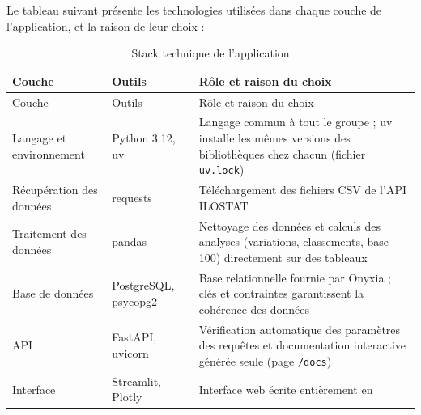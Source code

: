 \documentclass[
  french,
  12pt,
  letterpaper,
  DIV=11,
  numbers=noendperiod]{scrartcl}
\begin{document}
Le tableau suivant présente les technologies utilisées dans chaque
couche de l'application, et la raison de leur choix :

\begin{longtable}[]{@{}
  >{\raggedright\arraybackslash}p{}
  >{\raggedright\arraybackslash}p{}
  >{\raggedright\arraybackslash}p{}@{}}
\caption{Stack technique de l'application}\tabularnewline
\toprule\noalign{}
\begin{minipage}[b]{\linewidth}\raggedright
Couche
\end{minipage} & \begin{minipage}[b]{\linewidth}\raggedright
Outils
\end{minipage} & \begin{minipage}[b]{\linewidth}\raggedright
Rôle et raison du choix
\end{minipage} \\
\midrule\noalign{}
\endfirsthead
\toprule\noalign{}
\begin{minipage}[b]{\linewidth}\raggedright
Couche
\end{minipage} & \begin{minipage}[b]{\linewidth}\raggedright
Outils
\end{minipage} & \begin{minipage}[b]{\linewidth}\raggedright
Rôle et raison du choix
\end{minipage} \\
\midrule\noalign{}
\endhead
\bottomrule\noalign{}
\endlastfoot
Langage et environnement & Python 3.12, uv & Langage commun à tout le
groupe ; uv installe les mêmes versions des bibliothèques chez chacun
(fichier \texttt{uv.lock}) \\
Récupération des données & requests & Téléchargement des fichiers CSV de
l'API ILOSTAT \\
Traitement des données & pandas & Nettoyage des données et calculs des
analyses (variations, classements, base 100) directement sur des
tableaux \\
Base de données & PostgreSQL, psycopg2 & Base relationnelle fournie par
Onyxia ; clés et contraintes garantissent la cohérence des données \\
API & FastAPI, uvicorn & Vérification automatique des paramètres des
requêtes et documentation interactive générée seule (page
\texttt{/docs}) \\
Interface & Streamlit, Plotly & Interface web écrite entièrement en

\end{longtable}
\end{document}
